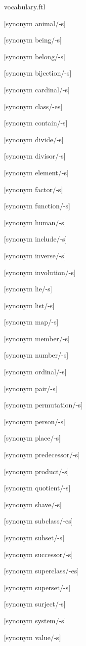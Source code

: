 \documentclass{stex}
\begin{document}
\begin{smodule}{vocabulary.ftl}
  \begin{forthel}

    [synonym animal/-s]

    [synonym being/-s]

    [synonym belong/-s]

    [synonym bijection/-s]

    [synonym cardinal/-s]

    [synonym class/-es]

    [synonym contain/-s]

    [synonym divide/-s]

    [synonym divisor/-s]

    [synonym element/-s]

    [synonym factor/-s]

    [synonym function/-s]

    [synonym human/-s]

    [synonym include/-s]

    [synonym inverse/-s]

    [synonym involution/-s]

    [synonym lie/-s]

    [synonym list/-s]

    [synonym map/-s]

    [synonym member/-s]

    [synonym number/-s]

    [synonym ordinal/-s]

    [synonym pair/-s]

    [synonym permutation/-s]

    [synonym person/-s]

    [synonym place/-s]

    [synonym predecessor/-s]

    [synonym product/-s]

    [synonym quotient/-s]
    
    [synonym shave/-s]

    [synonym subclass/-es]

    [synonym subset/-s]

    [synonym successor/-s]

    [synonym superclass/-es]

    [synonym superset/-s]

    [synonym surject/-s]

    [synonym system/-s]

    [synonym value/-s]
  \end{forthel}
\end{smodule}
\end{document}
